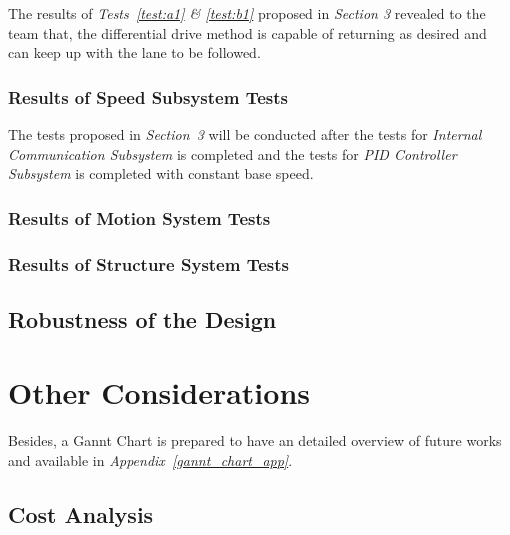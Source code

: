 \documentclass[a4paper,12pt]{article}
\begin{document}
The results of \textit{Tests~\ref{test:a1} \& \ref{test:b1}} proposed in \textit{Section 3} revealed to the team that, the differential drive method is capable of returning as desired and can keep up with the lane to be followed.



\subsubsection*{Results of Speed Subsystem Tests}


The tests proposed in \textit{Section~3} will be conducted after the tests for \textit{Internal Communication Subsystem} is completed and the tests for \textit{PID Controller Subsystem} is completed with constant base speed. 



\subsubsection*{Results of Motion System Tests}





\subsubsection*{Results of Structure System Tests}





\subsection{Robustness of the Design}









\section{Other Considerations}


Besides, a Gannt Chart is prepared to have an detailed overview of future works and available in \textit{Appendix~\ref{gannt_chart_app}}.





\subsection{Cost Analysis}
\end{document}
